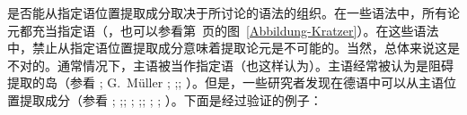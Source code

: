     是否能从指定语位置提取成分取决于所讨论的语法的组织。在一些语法中，所有论元都充当指定语（\citealp[--123]{Kratzer96a}，也可以参看第~\pageref{Abbildung-Kratzer}页的图~\ref{Abbildung-Kratzer}）。在这些语法中，禁止从指定语位置提取成分意味着提取论元是不可能的。当然，总体来说这是不对的。通常情况下，主语被当作指定语（\citealp[]{FG2002a}也这样认为）。主语经常被认为是阻碍提取的岛（参看 \citealp[, ]{Grewendorf89a}; G.\ Müller \citeyear[]{GMueller96b}; \citeyear[, ]{GMueller98a};\citealp[]{Sabel99a}; \citealp[]{Fanselow2001a}）。但是，一些\label{page-extraction-out-of-subjects}研究者发现在德语中可以从主语位置提取成分（参看 \citealp[]{Duerscheid89a}; \citealp*[]{Haider93a};\citealp{Pafel93b-u}; \citealp[]{Fortmann96a-u}; \citealp[]{Suchsland97a};\citealp[]{VS98a}; \citealp[]{Ballweg97a}; \citealp[--101]{Mueller99a}; \citealp[]{deKuthy2002a}）。下面是经过验证的例子：%
